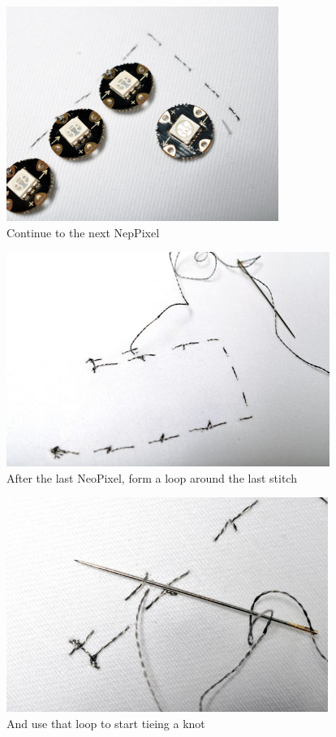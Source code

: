 \documentclass[letterpaper,twoside,12pt]{article}
\begin{document}
\begin{figure}[hbpt]\begin{centering}%
\includegraphics[height=2.75in]{flora_DSC_0116.jpg}
\caption{Continue to the next NepPixel}
\label{fig:flora_DSC_0116}
\end{centering}\end{figure}
\begin{figure}[hbpt]\begin{centering}%
\includegraphics[height=2.75in]{flora_DSC_0118.jpg}
\caption{After the last NeoPixel, form a loop around the last stitch}
\label{fig:flora_DSC_0118}
\end{centering}\end{figure}
\begin{figure}[hbpt]\begin{centering}%
\includegraphics[height=2.75in]{flora_DSC_0119.jpg} 
\caption{And use that loop to start tieing a knot}
\label{fig:flora_DSC_0119}
\end{centering}\end{figure}
\end{document}
